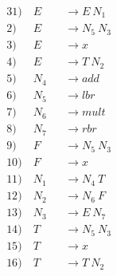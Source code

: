 \begin{alignat*}{3}
1) \ & E &&\rightarrow E\ N_1 \\
2) \ & E &&\rightarrow N_5\ N_3 \\
3) \ & E &&\rightarrow x \\
4) \ & E &&\rightarrow T\ N_2 \\
5) \ & N_4 &&\rightarrow add \\
6) \ & N_5 &&\rightarrow lbr \\
7) \ & N_6 &&\rightarrow mult \\
8) \ & N_7 &&\rightarrow rbr \\
9) \ & F &&\rightarrow N_5\ N_3 \\
10) \ & F &&\rightarrow x \\
11) \ & N_1 &&\rightarrow N_4\ T \\
12) \ & N_2 &&\rightarrow N_6\ F \\
13) \ & N_3 &&\rightarrow E\ N_7 \\
14) \ & T &&\rightarrow N_5\ N_3 \\
15) \ & T &&\rightarrow x \\
16) \ & T &&\rightarrow T\ N_2 \\
\end{alignat*}